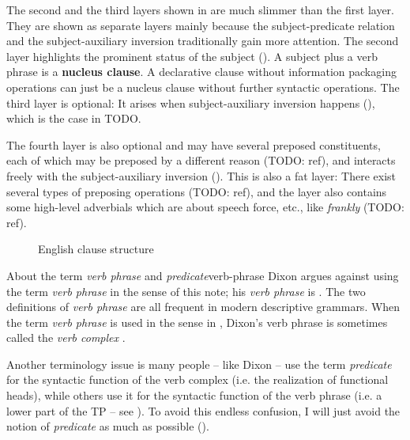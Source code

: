 \documentclass[UTF8, a4paper, oneside, scheme=plain]{ctexrep}
\newcommand*{\concept}[1]{\textbf{#1}}
\newcommand*{\term}[1]{\emph{#1}}
\newcommand{\corpus}[1]{\emph{#1}}
\begin{document}
The second and the third layers shown in 
are much slimmer than the first layer.
They are shown as separate layers mainly because 
the subject-predicate relation 
and the subject-auxiliary inversion 
traditionally gain more attention.
The second layer highlights the prominent status of the subject ().
A subject plus a verb phrase is a \concept{nucleus clause}.
A declarative clause without information packaging operations
can just be a nucleus clause without further syntactic operations.
The third layer is optional:
It arises when subject-auxiliary inversion happens (),
which is the case in TODO.

The fourth layer is also optional and may have several preposed constituents,
each of which may be preposed by a different reason (TODO: ref),
and interacts freely with the subject-auxiliary inversion 
().
This is also a fat layer:
There exist several types of preposing operations (TODO: ref),
and the layer also contains some high-level adverbials
which are about speech force, etc.,
like \corpus{frankly} (TODO: ref).

\begin{figure}[H]
    \centering
    
    \caption{English clause structure}
    \label{fig:clause-template}
\end{figure}

\begin{infobox}{About the term \term{verb phrase} and \term{predicate}}{verb-phrase}
    Dixon argues against using the term \term{verb phrase} in the sense of this note;
    his \term{verb phrase} is .
    The two definitions of \term{verb phrase} are all frequent in modern descriptive grammars.
    When the term \term{verb phrase} is used in the sense in ,
    Dixon's verb phrase is sometimes called the \term{verb complex} \citep{Friesen2017}.

    Another terminology issue is many people -- like Dixon -- use the term \term{predicate}
    for the syntactic function of the verb complex
    (i.e. the realization of functional heads),
    while others use it for the syntactic function of the verb phrase 
    (i.e. a lower part of the TP -- see ).
    To avoid this endless confusion, 
    I will just avoid the notion of \term{predicate} as much as possible ().
\end{infobox}
\end{document}
